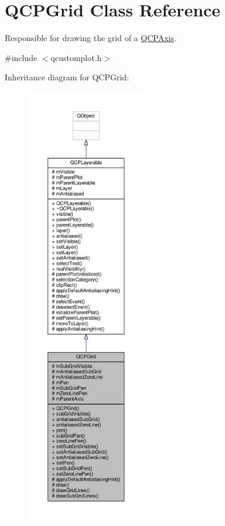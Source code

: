 \hypertarget{class_q_c_p_grid}{}\section{Q\+C\+P\+Grid Class Reference}
\label{class_q_c_p_grid}


Responsible for drawing the grid of a \hyperlink{class_q_c_p_axis}{Q\+C\+P\+Axis}.  




{\ttfamily \#include $<$qcustomplot.\+h$>$}



Inheritance diagram for Q\+C\+P\+Grid\+:\nopagebreak
\begin{figure}[H]
\begin{center}
\leavevmode
\includegraphics[height=550pt]{class_q_c_p_grid__inherit__graph}
\end{center}
\end{figure}


